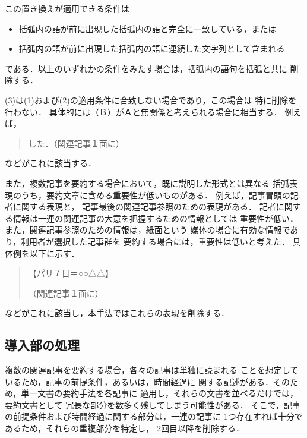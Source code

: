 この置き換えが適用できる条件は
\begin{itemize}
 \item 括弧内の語が前に出現した括弧内の語と完全に一致している，または
 \item 括弧内の語が前に出現した括弧内の語に連続した文字列として含まれる
\end{itemize}

である．以上のいずれかの条件をみたす場合は，括弧内の語句を括弧と共に
削除する．

(3)は(1)および(2)の適用条件に合致しない場合であり，この場合は
特に削除を行わない．
具体的には（Ｂ）がＡと無関係と考えられる場合に相当する．
例えば，
\begin{quote}
した．（関連記事１面に）
\end{quote}
などがこれに該当する．

また，複数記事を要約する場合において，既に説明した形式とは異なる
括弧表現のうち，要約文章に含める重要性が低いものがある．
例えば，記事冒頭の記者に関する表現と，
記事最後の関連記事参照のための表現がある．
記者に関する情報は一連の関連記事の大意を把握するための情報としては
重要性が低い．また，関連記事参照のための情報は，紙面という
媒体の場合に有効な情報であり，利用者が選択した記事群を
要約する場合には，重要性は低いと考えた．
具体例を以下に示す．
\begin{quote}
【パリ７日＝○○△△】

（関連記事１面に）
\end{quote}
などがこれに該当し，本手法ではこれらの表現を削除する．

\subsection{導入部の処理}
複数の関連記事を要約する場合，各々の記事は単独に読まれる
ことを想定しているため，記事の前提条件，あるいは，時間経過に
関する記述がある．そのため，単一文書の要約手法を各記事に
適用し，それらの文書を並べるだけでは，要約文書として
冗長な部分を数多く残してしまう可能性がある．
そこで，記事の前提条件および時間経過に関する部分は，一連の記事に
1つ存在すれば十分であるため，それらの重複部分を特定し，
2回目以降を削除する．

